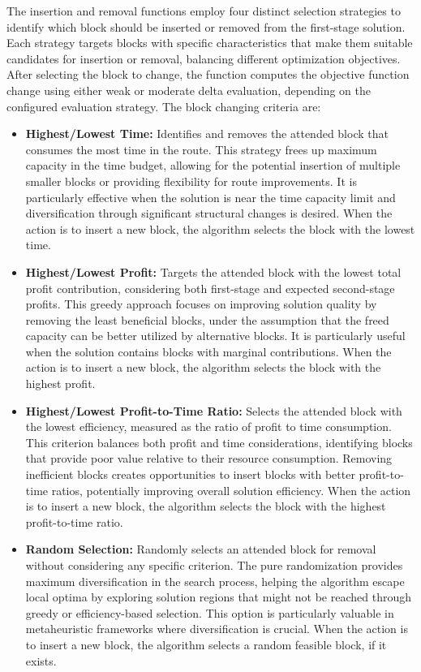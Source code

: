 The insertion and removal functions employ four distinct selection strategies to identify which block should be inserted or removed from the first-stage solution. Each strategy targets blocks with specific characteristics that make them suitable candidates for insertion or removal, balancing different optimization objectives. After selecting the block to change, the function computes the objective function change using either weak or moderate delta evaluation, depending on the configured evaluation strategy. The block changing criteria are:

\begin{itemize}
	\item \textbf{Highest/Lowest Time:} Identifies and removes the attended block that consumes the most time in the route. This strategy frees up maximum capacity in the time budget, allowing for the potential insertion of multiple smaller blocks or providing flexibility for route improvements. It is particularly effective when the solution is near the time capacity limit and diversification through significant structural changes is desired. When the action is to insert a new block, the algorithm selects the block with the lowest time.

	\item \textbf{Highest/Lowest Profit:} Targets the attended block with the lowest total profit contribution, considering both first-stage and expected second-stage profits. This greedy approach focuses on improving solution quality by removing the least beneficial blocks, under the assumption that the freed capacity can be better utilized by alternative blocks. It is particularly useful when the solution contains blocks with marginal contributions. When the action is to insert a new block, the algorithm selects the block with the highest profit.

	\item \textbf{Highest/Lowest Profit-to-Time Ratio:} Selects the attended block with the lowest efficiency, measured as the ratio of profit to time consumption. This criterion balances both profit and time considerations, identifying blocks that provide poor value relative to their resource consumption. Removing inefficient blocks creates opportunities to insert blocks with better profit-to-time ratios, potentially improving overall solution efficiency. When the action is to insert a new block, the algorithm selects the block with the highest profit-to-time ratio.

	\item \textbf{Random Selection:} Randomly selects an attended block for removal without considering any specific criterion. The pure randomization provides maximum diversification in the search process, helping the algorithm escape local optima by exploring solution regions that might not be reached through greedy or efficiency-based selection. This option is particularly valuable in metaheuristic frameworks where diversification is crucial. When the action is to insert a new block, the algorithm selects a random feasible block, if it exists.
\end{itemize}

